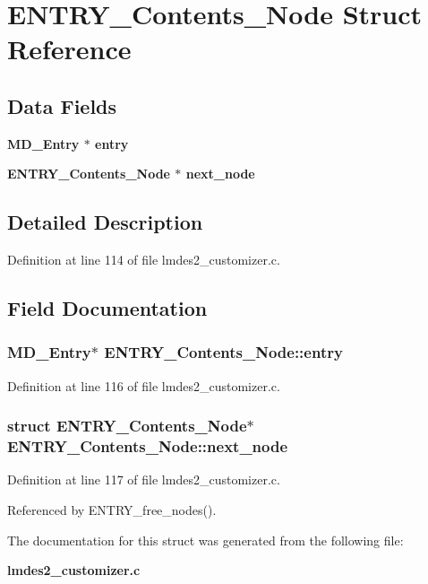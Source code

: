 \section{ENTRY\_\-Contents\_\-Node Struct Reference}
\label{structENTRY__Contents__Node}
\subsection*{Data Fields}
\begin{CompactItemize}
\item 
\bf{MD\_\-Entry} $\ast$ \bf{entry}
\item 
\bf{ENTRY\_\-Contents\_\-Node} $\ast$ \bf{next\_\-node}
\end{CompactItemize}


\subsection{Detailed Description}




Definition at line 114 of file lmdes2\_\-customizer.c.

\subsection{Field Documentation}
\subsubsection{\setlength{\rightskip}{0pt plus 5cm}\bf{MD\_\-Entry}$\ast$ \bf{ENTRY\_\-Contents\_\-Node::entry}}\label{structENTRY__Contents__Node_1aadfd826769ae425301e7786df83b85}




Definition at line 116 of file lmdes2\_\-customizer.c.
\subsubsection{\setlength{\rightskip}{0pt plus 5cm}struct \bf{ENTRY\_\-Contents\_\-Node}$\ast$ \bf{ENTRY\_\-Contents\_\-Node::next\_\-node}}\label{structENTRY__Contents__Node_9a1cf42f115da41c98d28ff488611a8f}




Definition at line 117 of file lmdes2\_\-customizer.c.

Referenced by ENTRY\_\-free\_\-nodes().

The documentation for this struct was generated from the following file:\begin{CompactItemize}
\item 
\bf{lmdes2\_\-customizer.c}\end{CompactItemize}
